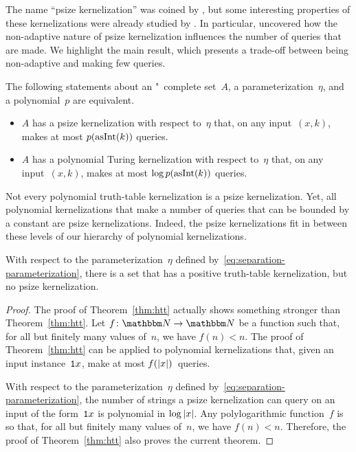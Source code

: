 The name \enquote{psize kernelization} was coined by \textcite{witteveen2019hierarchy}, but some interesting properties of these kernelizations were already studied by \textcite[Chapter~5]{weller2013aspects}.
In particular, \citeauthor{weller2013aspects} uncovered how the non-adaptive nature of psize kernelization influences the number of queries that are made.
We highlight the main result, which presents a trade-off between being non-adaptive and making few queries.
\begin{theorem}
  The following statements about an "~complete set~$A$, a parameterization~$\eta$, and a polynomial~$p$ are equivalent.
  \begin{itemize}
  \item
    $A$ has a psize kernelization with respect to~$\eta$ that, on any input~$(x, k)$, makes at most $p(\operatorname{asInt}(k))$ queries.
  \item
    $A$ has a polynomial Turing kernelization with respect to~$\eta$ that, on any input~$(x, k)$, makes at most $\log p(\operatorname{asInt}(k))$ queries.
  \end{itemize}
\end{theorem}

Not every polynomial truth-table kernelization is a psize kernelization.
Yet, all polynomial kernelizations that make a number of queries that can be bounded by a constant are psize kernelizations.
Indeed, the psize kernelizations fit in between these levels of our hierarchy of polynomial kernelizations.

\begin{theorem}
\label{thm:htt_psize}%
  With respect to the parameterization~$\eta$ defined by~\eqref{eq:separation-parameterization}, there is a set that has a positive truth-table kernelization, but no psize kernelization.
\end{theorem}
\begin{proof}
  The proof of Theorem~\ref{thm:htt} actually shows something stronger than Theorem~\ref{thm:htt}.
  Let $f\colon \bbN \to \bbN$ be a function such that, for all but finitely many values of~$n$, we have $f(n) < n$.
  The proof of Theorem~\ref{thm:htt} can be applied to polynomial kernelizations that, given an input instance~$\textnormal{\texttt{1}}x$, make at most $f({\lvert x\rvert})$~queries.

  With respect to the parameterization~$\eta$ defined by~\eqref{eq:separation-parameterization}, the number of strings a psize kernelization can query on an input of the form~$\textnormal{\texttt{1}}x$ is polynomial in $\log {\lvert x\rvert}$.
  Any polylogarithmic function~$f$ is so that, for all but finitely many values of~$n$, we have $f(n) < n$.
  Therefore, the proof of Theorem~\ref{thm:htt} also proves the current theorem.
\end{proof}

